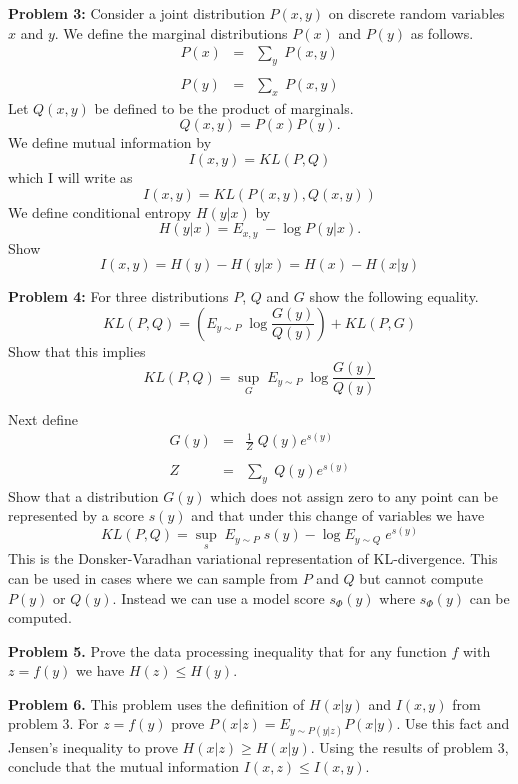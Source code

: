 \documentclass{article}
\begin{document}
\bigskip
{\bf Problem 3:} Consider a joint distribution $P(x,y)$ on discrete random variables $x$ and $y$.
We define the marginal distributions $P(x)$ and $P(y)$ as follows.
\begin{eqnarray*}
  P(x) & = & \sum_y\;P(x,y) \\
  \\
  P(y) & = & \sum_x\;P(x,y)
\end{eqnarray*}
Let $Q(x,y)$ be defined to be the product of marginals.
$$Q(x,y) = P(x)P(y).$$
We define mutual information by
{\color{red} $$I(x,y) = KL(P,Q)$$}
which I will write as
{\color{red} $$I(x,y) = KL(P(x,y),Q(x,y))$$}
We define conditional entropy $H(y|x)$ by
{\color{red} $$H(y|x) = E_{x,y} \;-\log P(y|x).$$}
Show
{\color{red} $$I(x,y) = H(y) - H(y|x) = H(x) - H(x|y)$$}


    
\bigskip
{\bf Problem 4:}
For three distributions $P$, $Q$ and $G$ show the following equality.
$$KL(P,Q) =  \left(E_{y \sim P} \;\log \frac{G(y)}{Q(y)}\right) + KL(P,G)$$
Show that this implies
$$KL(P,Q) =  \sup_G \;E_{y \sim P}\; \log \frac{G(y)}{Q(y)}$$

Next define
\begin{eqnarray*}
  G(y) & = & \frac{1}{Z}\;Q(y)e^{s(y)} \\
  \\
  Z & = & \sum_y \;Q(y)e^{s(y)}
\end{eqnarray*}
Show that a distribution $G(y)$ which does not assign zero to any point can be represented by a score $s(y)$ and that under this
change of variables we have
$$KL(P,Q) =  \sup_s \;E_{y \sim P}\; s(y) - \log E_{y \sim Q} \;e^{s(y)}$$
This is the Donsker-Varadhan variational representation of KL-divergence.
This can be used in cases where we can sample from $P$ and $Q$ but cannot compute $P(y)$ or $Q(y)$.
Instead we can use a model score $s_\Phi(y)$ where $s_\Phi(y)$ can be computed.
    
\bigskip
{\bf Problem 5.} Prove the data processing inequality that for any function $f$ with $z = f(y)$ we have $H(z) \leq H(y)$.

\bigskip
{\bf Problem 6.}  This problem uses the definition of $H(x|y)$ and $I(x,y)$ from problem 3.
For $z = f(y)$ prove $P(x|z) = E_{y \sim P(y|z)} P(x|y)$.  Use this fact and Jensen's inequality to prove $H(x|z) \geq H(x|y)$.
Using the results of problem 3, conclude that the mutual information $I(x,z) \leq I(x,y)$.
\end{document}
